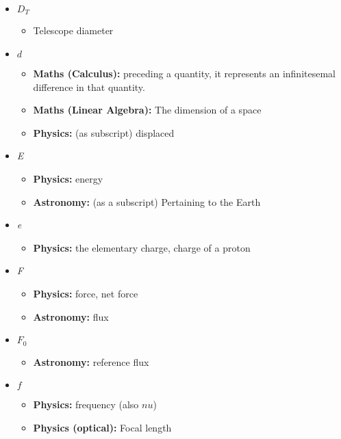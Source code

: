 \begin{itemize}
				\item $D_T$
				\begin{itemize}
					\item Telescope diameter
				\end{itemize}
				
				\item $d$
				\begin{itemize}
					\item\textbf{Maths (Calculus):} preceding a quantity, it represents an infinitesemal difference in that quantity.
					\item\textbf{Maths (Linear Algebra):} The dimension of a space
					\item\textbf{Physics:} (as subscript) displaced
					
				\end{itemize}
				
				\item \textit{E}
				\begin{itemize}
					\item\textbf{Physics:} energy
					\item\textbf{Astronomy:} (as a subscript) Pertaining to the Earth
				\end{itemize}
				
				\item \textit{e}
				\begin{itemize}
					\item\textbf{Physics:} the elementary charge, charge of a proton
				\end{itemize}
				
				\item \textit{F}
				\begin{itemize}
					\item\textbf{Physics:} force, net force
					\item\textbf{Astronomy:} flux
				\end{itemize}
				
				\item $F_0$
				\begin{itemize}
					\item\textbf{Astronomy:} reference flux
				\end{itemize}
				
				\item $f$
				\begin{itemize}
					\item\textbf{Physics:} frequency (also $nu$)
					\item\textbf{Physics (optical):} Focal length
				\end{itemize}
				

\end{itemize}
